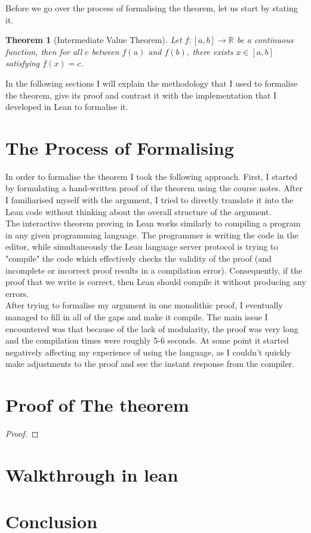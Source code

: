 \documentclass[11pt]{article}
\newcommand\R{\mathbb{R}}
\newtheorem*{theorem}{Theorem}
\begin{document}
Before we go over the process of formalising the theorem, let us start by
stating it.
\begin{theorem}[Intermediate Value Theorem]
  Let $f : [a, b] \to \R  $ be a continuous function, then for all $c$ between
  $f(a)$ and $f(b)$, there exists $x \in [a, b] $ satisfying $f(x) = c$.
\end{theorem}

In the following sections I will explain the methodology that I used to
formalise the theorem, give its proof and contrast it with the implementation
that I developed in Lean to formalise it.


\section*{ The Process of Formalising }

In order to formalise the theorem I took the following approach. First, I
started by formulating a hand-written proof of the theorem using the course
notes. After I familiarised myself with the argument, I tried to directly
translate it into the Lean code without thinking about the overall structure of
the argument. \\

The interactive theorem proving in Lean works similarly to
compiling a program in any given programming language. The programmer is writing
the code in the editor, while simultaneously the Lean language server protocol
is trying to "compile" the code which effectively checks the validity of the
proof (and incomplete or incorrect proof results in a compilation error).
Consequently, if the proof that we write is correct, then Lean should compile
it without producing any errors.\\

After trying to formalise my argument in one monolithic proof, I eventually
managed to fill in all of the gaps and make it compile. The main issue I
encountered was that because of the lack of modularity, the proof was very long
and the compilation times were roughly 5-6 seconds. At some point it started
negatively affecting my experience of using the language, as I couldn't quickly
make adjustments to the proof and see the instant response from the compiler.




\section*{ Proof of The theorem }


\begin{proof}

\end{proof}
\section*{ Walkthrough in lean }
\section*{ Conclusion }
\end{document}
